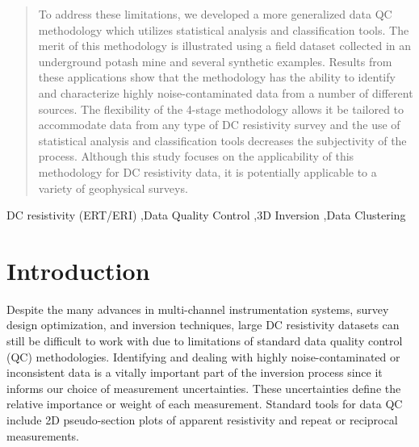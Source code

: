 \documentclass[final,authoryear,5p,times,twocolumn]{elsarticle}
\begin{document}
\begin{frontmatter}
\begin{abstract}
To address these limitations, we developed a more generalized data QC methodology which utilizes statistical analysis and classification tools. The merit of this methodology is illustrated using a field dataset collected in an underground potash mine and several synthetic examples. Results from these applications show that the methodology has the ability to identify and characterize highly noise-contaminated data from a number of different sources. The flexibility of the 4-stage methodology allows it be tailored to accommodate data from any type of DC resistivity survey and the use of statistical analysis and classification tools decreases the subjectivity of the process. Although this study focuses on the applicability of this methodology for DC resistivity data, it is potentially applicable to a variety of geophysical surveys.

\end{abstract}

\begin{keyword}
DC resistivity (ERT/ERI) \sep  Data Quality Control \sep 3D Inversion \sep Data Clustering


\end{keyword}

\end{frontmatter}

\linenumbers


\section{Introduction}
\label{Introduction}

Despite the many advances in multi-channel instrumentation systems, survey design optimization, and inversion techniques, large DC resistivity datasets can still be difficult to work with due to limitations of standard data quality control (QC) methodologies. Identifying and dealing with highly noise-contaminated or inconsistent data is a vitally important part of the inversion process since it informs our choice of measurement uncertainties.  These uncertainties define the relative importance or weight of each measurement. Standard tools for data QC include 2D pseudo-section plots of apparent resistivity and repeat or reciprocal measurements.
\end{document}
